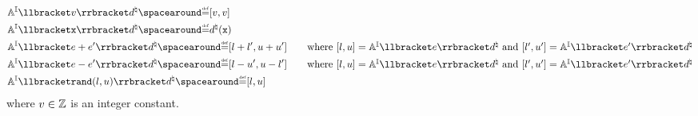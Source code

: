 \begin{description}
{  }
  \begin{align*}
    &\intervalaexp \semanticsof{\defvalue}\defabstractvalue \DefeQ \interval{\defvalue}{\defvalue} \\
    &\intervalaexp \semanticsof{\defvariable}\defabstractvalue \DefeQ \defabstractvalue(\defvariable) \\
    &\intervalaexp \semanticsof{\defaexp + \defaexp'} \defabstractvalue \DefeQ \interval{l + l'}{u + u'} \tag*{where $\interval{l}{u} = \intervalaexp\semanticsof{\defaexp}\defabstractvalue$ and $ \interval{l'}{u'} = \intervalaexp\semanticsof{\defaexp'}\defabstractvalue$} \\
    &\intervalaexp \semanticsof{\defaexp - \defaexp'} \defabstractvalue \DefeQ \interval{l - u'}{u - l'} \tag*{where $\interval{l}{u} = \intervalaexp\semanticsof{\defaexp}\defabstractvalue$ and $ \interval{l'}{u'} = \intervalaexp\semanticsof{\defaexp'}\defabstractvalue$} \\
    &\intervalaexp \semanticsof{\randval(l, u)}\defabstractvalue \DefeQ \interval{l}{u}
  \end{align*}
  where $v\in\mathbb{Z}$ is an integer constant.


\end{description}

